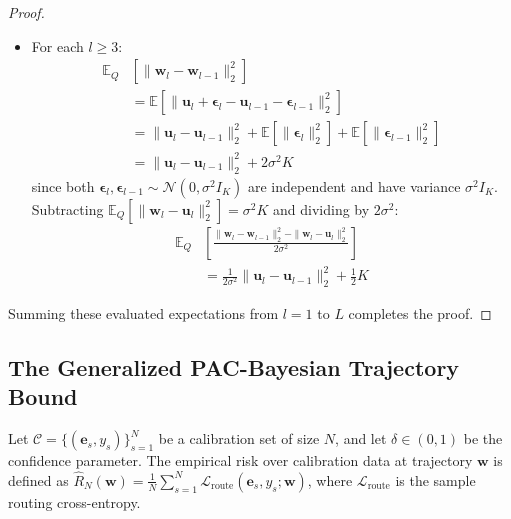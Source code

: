 \begin{proof}
\begin{enumerate}
\begin{itemize}
        \item For each $l \ge 3$:
        \begin{align}
        \mathbb{E}_{Q} &[\|\mathbf{w}_l - \mathbf{w}_{l-1}\|_2^2] \nonumber \\
        &= \mathbb{E} [\|\mathbf{u}_l + \boldsymbol{\epsilon}_l - \mathbf{u}_{l-1} - \boldsymbol{\epsilon}_{l-1}\|_2^2] \nonumber \\
        &= \|\mathbf{u}_l - \mathbf{u}_{l-1}\|_2^2 + \mathbb{E}[\|\boldsymbol{\epsilon}_l\|_2^2] + \mathbb{E}[\|\boldsymbol{\epsilon}_{l-1}\|_2^2] \nonumber \\
        &= \|\mathbf{u}_l - \mathbf{u}_{l-1}\|_2^2 + 2\sigma^2 K
        \end{align}
        since both $\boldsymbol{\epsilon}_l, \boldsymbol{\epsilon}_{l-1} \sim \mathcal{N}(0, \sigma^2 I_K)$ are independent and have variance $\sigma^2 I_K$. Subtracting $\mathbb{E}_Q [\|\mathbf{w}_l - \mathbf{u}_l\|_2^2] = \sigma^2 K$ and dividing by $2\sigma^2$:
        \begin{equation}
        \begin{split}
        \mathbb{E}_{Q} &\left[ \frac{\|\mathbf{w}_l - \mathbf{w}_{l-1}\|_2^2 - \|\mathbf{w}_l - \mathbf{u}_l\|_2^2}{2\sigma^2} \right] \\
        &= \frac{1}{2\sigma^2} \|\mathbf{u}_l - \mathbf{u}_{l-1}\|_2^2 + \frac{1}{2} K
        \end{split}
        \end{equation}
    \end{itemize}
\end{enumerate}
Summing these evaluated expectations from $l=1$ to $L$ completes the proof.
\end{proof}

\subsection{The Generalized PAC-Bayesian Trajectory Bound}
Let $\mathcal{C} = \{(\mathbf{e}_s, y_s)\}_{s=1}^N$ be a calibration set of size $N$, and let $\delta \in (0,1)$ be the confidence parameter. The empirical risk over calibration data at trajectory $\mathbf{w}$ is defined as $\hat{R}_N(\mathbf{w}) = \frac{1}{N} \sum_{s=1}^N \mathcal{L}_{\text{route}}(\mathbf{e}_s, y_s; \mathbf{w})$, where $\mathcal{L}_{\text{route}}$ is the sample routing cross-entropy. 


